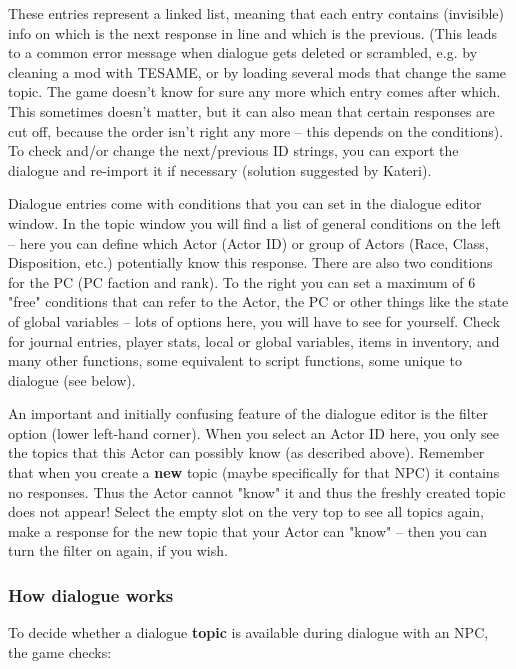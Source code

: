 These entries represent a linked list, meaning that each entry contains
(invisible) info on which is the next response in line and which is the
previous. (This leads to a common error message when dialogue gets
deleted or scrambled, e.g. by cleaning a mod with TESAME, or by loading
several mods that change the same topic. The game doesn't know for sure
any more which entry comes after which. This sometimes doesn't matter,
but it can also mean that certain responses are cut off, because the
order isn't right any more -- this depends on the conditions). To check
and/or change the next/previous ID strings, you can export the dialogue
and re-import it if necessary (solution suggested by Kateri).

Dialogue entries come with conditions that you can set in the dialogue
editor window. In the topic window you will find a list of general
conditions on the left -- here you can define which Actor (Actor ID) or
group of Actors (Race, Class, Disposition, etc.) potentially know this
response. There are also two conditions for the PC (PC faction and
rank). To the right you can set a maximum of 6 "free" conditions that
can refer to the Actor, the PC or other things like the state of global
variables -- lots of options here, you will have to see for yourself.
Check for journal entries, player stats, local or global variables,
items in inventory, and many other functions, some equivalent to script
functions, some unique to dialogue (see below).

An important and initially confusing feature of the dialogue editor is
the filter option (lower left-hand corner). When you select an Actor ID
here, you only see the topics that this Actor can possibly know (as
described above). Remember that when you create a \textbf{new} topic
(maybe specifically for that NPC) it contains no responses. Thus the
Actor cannot "know" it and thus the freshly created topic does not
appear! Select the empty slot on the very top to see all topics again,
make a response for the new topic that your Actor can "know" -- then you
can turn the filter on again, if you wish.

\hypertarget{how-dialogue-works}{%
\subsubsection{How dialogue works}\label{how-dialogue-works}}

To decide whether a dialogue \textbf{topic} is available during dialogue
with an NPC, the game checks:

